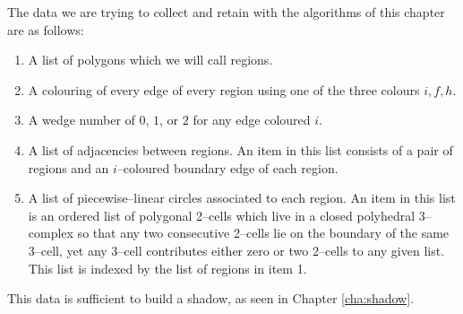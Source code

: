 The data we are trying to collect and retain with the algorithms of this chapter are as follows:
\begin{enumerate}
  \item A list of polygons which we will call regions.
  \item A colouring of every edge of every region using one of the three colours $i,f,h$.
  \item A wedge number of $0$, $1$, or $2$ for any edge coloured $i$.
  \item A list of adjacencies between regions.
        An item in this list consists of a pair of regions and an $i$--coloured boundary edge of each region.
  \item A list of piecewise--linear circles associated to each region.
        An item in this list is an ordered list of polygonal 2--cells which live in a closed polyhedral 3--complex so that any two consecutive 2--cells lie on the boundary of the same 3--cell, yet any 3--cell contributes either zero or two 2--cells to any given list.  This list is indexed by the list of regions in item 1.
\end{enumerate}
This data is sufficient to build a shadow, as seen in Chapter \ref{cha:shadow}.

